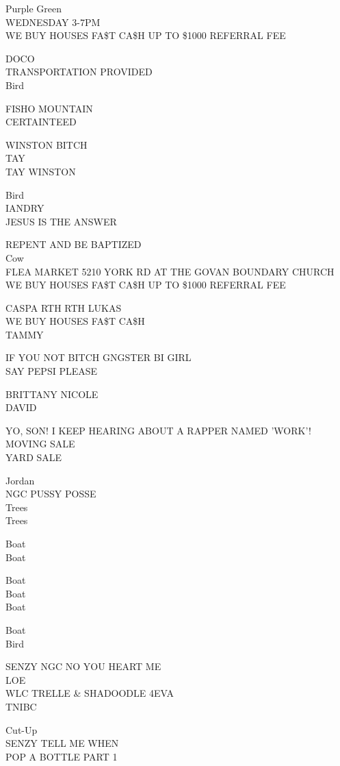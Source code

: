 \documentclass[10pt,letterpaper]{article}
\begin{document}
Purple Green\\
WEDNESDAY 3{-}7PM\\
WE BUY HOUSES FA\$T CA\$H UP TO \$1000 REFERRAL FEE

DOCO\\
TRANSPORTATION PROVIDED\\
Bird

FISHO MOUNTAIN\\
CERTAINTEED

WINSTON BITCH\\
TAY\\
TAY WINSTON

Bird\\
IANDRY\\
JESUS IS THE ANSWER

REPENT AND BE BAPTIZED\\
Cow\\
FLEA MARKET 5210 YORK RD AT THE GOVAN BOUNDARY CHURCH\\
WE BUY HOUSES FA\$T CA\$H UP TO \$1000 REFERRAL FEE

CASPA RTH RTH LUKAS\\
WE BUY HOUSES FA\$T CA\$H\\
TAMMY

IF YOU NOT BITCH GNGSTER BI GIRL\\
SAY PEPSI PLEASE

BRITTANY NICOLE\\
DAVID

YO, SON!  I KEEP HEARING ABOUT A RAPPER NAMED 'WORK'!\\
MOVING SALE\\
YARD SALE

Jordan\\
NGC PUSSY POSSE\\
Trees\\
Trees

Boat\\
Boat

Boat\\
Boat\\
Boat

Boat\\
Bird

SENZY NGC NO YOU HEART ME\\
LOE\\
WLC TRELLE \& SHADOODLE 4EVA\\
TNIBC

Cut{-}Up\\
SENZY TELL ME WHEN\\
POP A BOTTLE PART 1
\end{document}
